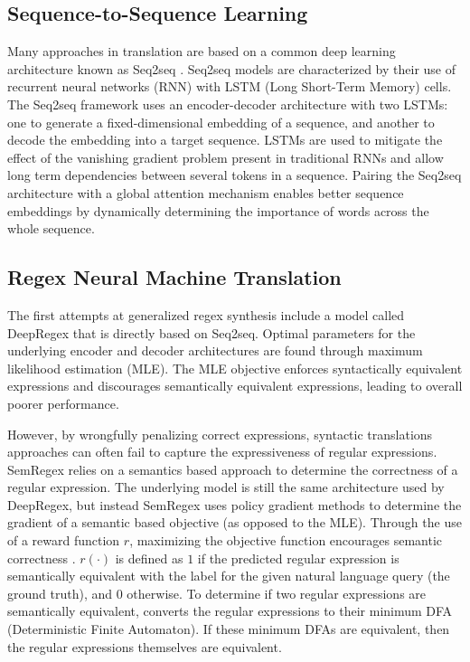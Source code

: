 \documentclass[11pt,a4paper]{article}
\begin{document}
\subsection*{Sequence-to-Sequence Learning}

Many approaches in translation are based on a common deep learning architecture known as Seq2seq \cite{seq2seq}. Seq2seq models are characterized by their use of recurrent neural networks (RNN) with LSTM (Long Short-Term Memory) \cite{hochreiter1997long} cells. The Seq2seq framework uses an encoder-decoder architecture with two LSTMs: one to generate a fixed-dimensional embedding of a sequence, and another to decode the embedding into a target sequence. LSTMs are used to mitigate the effect of the vanishing gradient problem present in traditional RNNs and allow long term dependencies between several tokens in a sequence. Pairing the Seq2seq architecture with a global attention mechanism \cite{attention} enables better sequence embeddings by dynamically determining the importance of words across the whole sequence. 

\subsection*{Regex Neural Machine Translation}

The first attempts at generalized regex synthesis include a model called DeepRegex \cite{locascio-etal-2016-neural} that is directly based on Seq2seq. Optimal parameters for the underlying encoder and decoder architectures are found through maximum likelihood estimation (MLE). The MLE objective enforces syntactically equivalent expressions and discourages semantically equivalent expressions, leading to overall poorer performance.

However, by wrongfully penalizing correct expressions, syntactic translations approaches can often fail to capture the expressiveness of regular expressions. SemRegex \cite{zhong-etal-2018-semregex} relies on a semantics based approach to determine the correctness of a regular expression. The underlying model is still the same architecture used by DeepRegex, but instead SemRegex uses policy gradient methods \cite{Williams:92} to determine the gradient of a semantic based objective (as opposed to the MLE). Through the use of a reward function $r$, maximizing the objective function encourages semantic correctness \cite{zhong-etal-2018-semregex}. $r(\cdot)$ is defined as $1$ if the predicted regular expression is semantically equivalent with the label for the given natural language query (the ground truth), and $0$ otherwise. To determine if two regular expressions are semantically equivalent, \cite{zhong-etal-2018-semregex} converts the regular expressions to their minimum DFA (Deterministic Finite Automaton). If these minimum DFAs are equivalent, then the regular expressions themselves are equivalent. 
\end{document}
